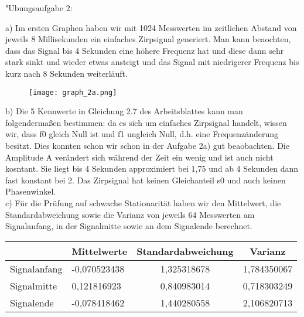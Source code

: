 \documentclass[fleqn,a4paper,12pt]{article}
\begin{document}
"Ubungsaufgabe 2: \newline

a) Im ersten Graphen haben wir mit 1024 Messwerten im zeitlichen Abstand von jeweils 8 Millisekunden ein einfaches Zirpsignal generiert.
Man kann beaochten, dass das Signal bis 4 Sekunden eine höhere Frequenz hat und diese dann sehr stark sinkt und wieder etwas ansteigt und das Signal mit niedrigerer Frequenz bis kurz nach 8 Sekunden weiterl{\"a}uft.

\begin{center}
\begin{figure}[h]
    \begin{scriptsize}
  \begin{center}
      \texttt{[image: graph\_2a.png]}
      \end{center}
 	\end{scriptsize}
  \end{figure}
\end{center}
  
b) Die 5 Kennwerte in Gleichung 2.7 des Arbeitsblattes kann man folgendermaßen bestimmen:
da es sich um einfaches Zirpsignal handelt, wissen wir, dass f0 gleich Null ist und f1 ungleich Null, d.h. eine Frequenz{\"a}nderung besitzt.
Dies konnten schon wir schon in der Aufgabe 2a) gut beaobachten. Die Amplitude A verändert sich während der Zeit ein wenig und ist auch nicht kosntant.
Sie liegt bis 4 Sekunden approximiert bei 1,75 und ab 4 Sekunden dann fast konstant bei 2.
Das Zirpsignal hat keinen Gleichanteil s0 und auch keinen Phasenwinkel.\\



c) F{\"u}r die Pr{\"u}fung auf schwache Stationarit{\"a}t haben wir den Mittelwert, die Standardabweichung sowie die Varianz von jeweils 64 Messwerten am Signalanfang, in der Signalmitte sowie an dem Signalende berechnet.

\begin{table}[h]
\centering
\begin{tabular}{l|l|c|l}
             & \multicolumn{1}{c|}{Mittelwerte} & Standardabweichung & \multicolumn{1}{c}{Varianz} \\ \hline
Signalanfang & -0,070523438                     & 1,325318678        & 1,784350067                 \\
Signalmitte  & 0,121816923                      & 0,840983014        & 0,718303249                 \\
Signalende   & -0,078418462                     & 1,440280558        & 2,106820713                
\end{tabular}
\end{table}
\end{document}
